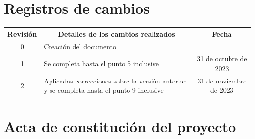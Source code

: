 \documentclass[
11pt, %
]{Clases/charter}
\begin{document}
\maketitle
\thispagestyle{empty}
\pagebreak


\thispagestyle{empty}
{\setlength{\parskip}{0pt}
	\tableofcontents{}
}
\pagebreak


\section*{Registros de cambios}
\label{sec:registro}


\begin{table}[ht]
	\label{tab:registro}
	\centering
	\begin{tabularx}{\linewidth}{@{}|c|X|c|@{}}
		\hline
		\rowcolor[HTML]{C0C0C0}
		Revisión & \multicolumn{1}{c|}{\cellcolor[HTML]{C0C0C0}Detalles de los cambios realizados}           & Fecha                   \\ \hline
		0        & Creación del documento                                                                    & \fechaInicioName        \\ \hline
		1        & Se completa hasta el punto 5 inclusive                                                    & 31 de octubre de 2023   \\ \hline
		2        & Aplicadas correcciones sobre la versión anterior y se completa hasta el punto 9 inclusive & 31 de noviembre de 2023 \\ \hline
	\end{tabularx}
\end{table}

\pagebreak



\section*{Acta de constitución del proyecto}
\label{sec:acta}
\end{document}
